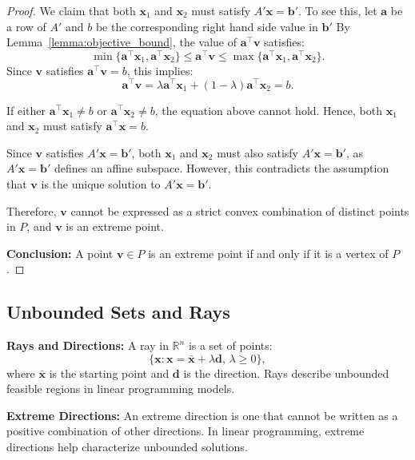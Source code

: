 \begin{proof}
We claim that both \( \mathbf{x}_1 \) and \( \mathbf{x}_2 \) must satisfy \( A'\mathbf{x} = \mathbf{b}' \).  To see this, 
let $\mathbf{a}$ be a row of $A'$ and $b$ be the corresponding right hand side value in $\mathbf{b}'$
By Lemma~\ref{lemma:objective_bound}, the value of \( \mathbf{a}^\top \mathbf{v} \) satisfies:
\[
\min\{\mathbf{a}^\top\mathbf{x}_1, \mathbf{a}^\top\mathbf{x}_2\} \leq \mathbf{a}^\top\mathbf{v} \leq \max\{\mathbf{a}^\top\mathbf{x}_1, \mathbf{a}^\top\mathbf{x}_2\}.
\]
Since \( \mathbf{v} \) satisfies \( \mathbf{a}^\top\mathbf{v} = b\), this implies:
\[
\mathbf{a}^\top\mathbf{v} = \lambda \mathbf{a}^\top\mathbf{x}_1 + (1-\lambda) \mathbf{a}^\top\mathbf{x}_2 = b.
\]

If either \( \mathbf{a}^\top\mathbf{x}_1 \neq b \) or \( \mathbf{a}^\top\mathbf{x}_2 \neq b\), the equation above cannot hold. Hence, both \( \mathbf{x}_1 \) and \( \mathbf{x}_2 \) must satisfy \( \mathbf{a}^\top\mathbf{x} = b \).

Since \( \mathbf{v} \) satisfies \( A'\mathbf{x} = \mathbf{b}' \), both \( \mathbf{x}_1 \) and \( \mathbf{x}_2 \) must also satisfy \( A'\mathbf{x} = \mathbf{b}' \), as \( A'\mathbf{x} = \mathbf{b}' \) defines an affine subspace. However, this contradicts the assumption that \( \mathbf{v} \) is the unique solution to \( A'\mathbf{x} = \mathbf{b}' \).

Therefore, \( \mathbf{v} \) cannot be expressed as a strict convex combination of distinct points in \( P \), and \( \mathbf{v} \) is an extreme point.

\textbf{Conclusion:} A point \( \mathbf{v} \in P \) is an extreme point if and only if it is a vertex of \( P \).
\end{proof}

\subsection{Unbounded Sets and Rays}

\textbf{Rays and Directions:}  
A ray in \(\mathbb{R}^n\) is a set of points:
\[
\{\mathbf{x} : \mathbf{x} = \mathbf{\bar x} + \lambda \mathbf{d}, \, \lambda \geq 0\},
\]
where \(\mathbf{\bar x}\) is the starting point and \(\mathbf{d}\) is the direction. Rays describe unbounded feasible regions in linear programming models.

\textbf{Extreme Directions:}  
An extreme direction is one that cannot be written as a positive combination of other directions. In linear programming, extreme directions help characterize unbounded solutions.


